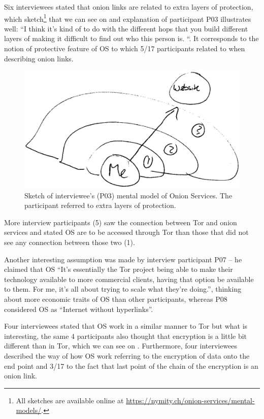 Six interviewees stated that onion links are related to extra layers of protection, which sketch\footnote{All sketches are available online at
\url{https://nymity.ch/onion-services/mental-models/}.} that we can see on  and explanation of participant P03 illustrates well:   “I think it's kind of to do with the different hops that you build different layers of making it difficult to find out who this person is. “. It corresponds to the notion of protective feature of OS to which 5/17 participants related to when describing onion links.

\begin{figure}[!ht]
    \centering
        \centering
        \includegraphics[width=0.8\linewidth]{figures/p03-os-sketch-kopia2.jpg}
        \caption{Sketch of interviewee's (P03) mental model of Onion Services. The participant referred to extra layers of protection.}
        \label{fig:os-sketch}
\end{figure}

More interview participants (5) saw the connection between Tor and onion services and stated OS are to be accessed through Tor than those that did not see any connection between those two (1).

Another interesting assumption was made by interview participant P07 – he claimed that OS 
“It's essentially the Tor project being able to make their technology available to more commercial clients, having that option be available to them. For me, it's all about trying to scale what they're doing.”, thinking about more economic traits of OS than other participants, whereas P08 considered OS as “Internet without hyperlinks”.

Four interviewees stated that OS work in a similar manner to Tor but what is interesting, the same 4 participants also thought that encryption is a little bit different than in Tor, which we can see on . Furthermore, four interviewees described the way of how OS work referring to the encryption of data onto the end point and 3/17 to the fact that last point of the chain of the encryption is an onion link. 


